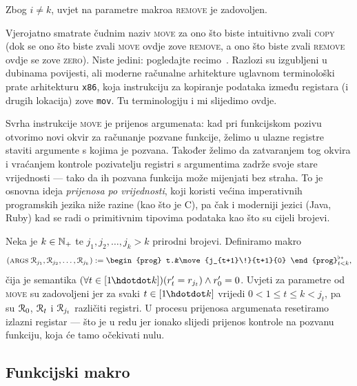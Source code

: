 Zbog $i\ne k$, uvjet na parametre makroa \textsc{remove} je zadovoljen.

\begin{napomena}[{name=[{terminologija makroa za kopiranje\slash premještanje registara}]}]
    Vjerojatno smatrate čudnim naziv \textsc{move} za ono što biste intuitivno zvali \textsc{copy} (dok se ono što biste zvali \textsc{move} ovdje zove \textsc{remove}, a ono što biste zvali \textsc{remove} ovdje se zove \textsc{zero}). Niste jedini: pogledajte recimo~\cite{url:movecopy}. Razlozi su izgubljeni u dubinama povijesti, ali moderne računalne arhitekture uglavnom terminološki prate arhitekturu \texttt{x86}, koja instrukciju za kopiranje podataka između registara (i drugih lokacija) zove \texttt{mov}. Tu terminologiju i mi slijedimo ovdje.
\end{napomena}

Svrha instrukcije \textsc{move} je prijenos argumenata: kad pri funkcijskom pozivu otvorimo novi okvir za računanje pozvane funkcije, želimo u ulazne registre staviti argumente s kojima je pozvana. Također želimo da zatvaranjem tog okvira i vraćanjem kontrole pozivatelju registri s argumentima zadrže svoje stare vrijednosti --- tako da ih pozvana funkcija može mijenjati bez straha. To je osnovna ideja \emph{prijenosa po vrijednosti}, koji koristi većina imperativnih programskih jezika niže razine (kao što je C), pa čak i moderniji jezici (Java, Ruby) kad se radi o primitivnim tipovima podataka kao što su cijeli brojevi.

Neka je $k\in{\mathbb N}_+$ te $j_1,j_2,\dotsc,j_k>k$ prirodni brojevi. %
 Definiramo makro
\begin{equation}
    (\textsc{args} \;\reg{j_1},\reg{j_2},\dotsc,\reg{j_k}):=\begin{prog} t.&\move{j_{t+1}\!}{t+1}{0}
    \end{prog}^{\flat*}_{t<k}\text,
\end{equation}
čija je semantika $(\forall t\in[1\mspace{-1mu}\dd k])(r_t'=r_{j_t})\land r_0'=0$. Uvjeti za parametre od \textsc{move} su zadovoljeni jer za svaki $t\in[1\mspace{-1mu}\dd k]$ vrijedi $0<1\le t\le k<j_t$, pa su $\mathcal R_{0}$, $\mathcal R_{t}$ i $\mathcal R_{j_t}$ različiti registri. U procesu prijenosa argumenata resetiramo izlazni registar --- što je u redu jer ionako slijedi prijenos kontrole na pozvanu funkciju, koja će tamo očekivati nulu.

\subsection{Funkcijski makro}

